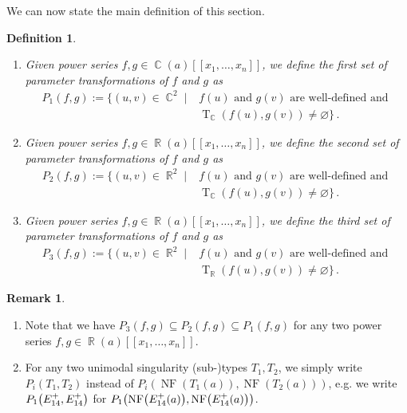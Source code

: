 \documentclass[noend]{amsproc}
\newtheorem{defn}[theorem]{Definition}
\theoremstyle{definition}
\newtheorem{remark}[theorem]{Remark}
\let\originalleft\left
\let\originalright\right
\renewcommand{\left}{\mathopen{}\mathclose\bgroup\originalleft}
\renewcommand{\right}{\aftergroup\egroup\originalright}
\DeclareMathOperator{\R}{\mathbb{R}}
\DeclareMathOperator{\C}{\mathbb{C}}
\DeclareMathOperator{\NF}{NF}
\DeclareMathOperator{\T}{T}
\begin{document}
We can now state the main definition of this section.

\begin{defn}
\leavevmode
\begin{enumerate}
\item
Given power series $f,g \in \C(a)[[x_1,\ldots,x_n]]$, we define the
first set of parameter transformations of $f$ and $g$ as
\begin{align*}
P_1(f, g)
:= \bigl\{ (u, v) \in \C^2 \mid
&f(u) \text{ and } g(v) \text{ are well-defined and } \\
&\T_{\C}(f(u), g(v)) \neq \varnothing \bigr\} \,.
\end{align*}

\item
Given power series $f,g \in \R(a)[[x_1,\ldots,x_n]]$, we define the
second set of parameter transformations of $f$ and $g$ as
\begin{align*}
P_2(f, g)
:= \bigl\{ (u, v) \in \R^2 \mid
&f(u) \text{ and } g(v) \text{ are well-defined and } \\
&\T_{\C}(f(u), g(v)) \neq \varnothing \bigr\} \,.
\end{align*}

\item
Given power series $f,g \in \R(a)[[x_1,\ldots,x_n]]$, we define the
third set of parameter transformations of $f$ and $g$ as
\begin{align*}
P_3(f, g)
:= \bigl\{ (u, v) \in \R^2 \mid
&f(u) \text{ and } g(v) \text{ are well-defined and } \\
&\T_{\R}(f(u), g(v)) \neq \varnothing \bigr\} \,.
\end{align*}
\end{enumerate}
\end{defn}

\begin{remark}
\leavevmode
\begin{enumerate}
\item
Note that we have $P_3(f, g) \subseteq P_2(f, g) \subseteq P_1(f, g)$ for any
two power series $f,g \in \R(a)[[x_1,\ldots,x_n]]$.

\item
For any two unimodal singularity (sub-)types $T_1, T_2$, we simply write
$P_i(T_1,T_2)$ instead of $P_i(\NF(T_1(a)), \NF(T_2(a)))$, e.g. we write
$P_1\left(E_{14}^+, E_{14}^+\right)$ for
$P_1\left(\NF\left(E_{14}^+(a)\right), \NF\left(E_{14}^+(a)\right)\right)$.
\end{enumerate}
\end{remark}
\end{document}
